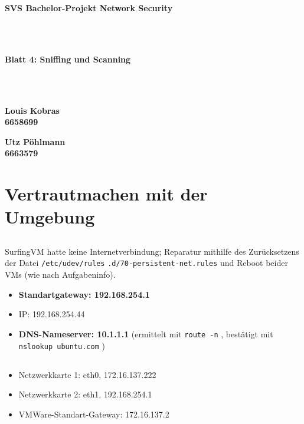 \documentclass[twoside]{article}
\newcommand{\ttt}[1]{%
	\texttt{#1}%
}
\begin{document}
\pagestyle{fancy}
\fancyhead{}
\fancyfoot{}

\begin{center}
\begin{Huge}
\textbf{SVS Bachelor-Projekt Network Security}
\end{Huge}\\\-\\
\begin{Large}
\textbf{Blatt 4: Sniffing und Scanning}
\end{Large}\\\-\\
\begin{minipage}[t]{0.48\textwidth}
\begin{center}\textbf{
	Louis Kobras\\
	6658699}
\end{center}
\end{minipage}
\begin{minipage}[t]{0.48\textwidth}
\begin{center}\textbf{
	Utz Pöhlmann\\
	6663579}
\end{center}
\end{minipage}
\end{center}

\section{Vertrautmachen mit der Umgebung}
\setcounter{subsection}{1}
\subsection{}
SurfingVM hatte keine Internetverbindung; Reparatur mithilfe des Zurücksetzens der Datei \ttt{/etc/udev/rules} \ttt{.d/70-persistent-net.rules} und Reboot beider VMs (wie nach Aufgabeninfo).
\begin{itemize}
	\item \textbf{Standartgateway: 192.168.254.1}
	\item IP: 192.168.254.44
	\item \textbf{DNS-Nameserver: 10.1.1.1} (ermittelt mit \ttt{route -n}, bestätigt mit \ttt{nslookup ubuntu.com})
\end{itemize}
\subsection{}
\begin{itemize}
	\item Netzwerkkarte 1: eth0, 172.16.137.222
	\item Netzwerkkarte 2: eth1, 192.168.254.1
	\item VMWare-Standart-Gateway: 172.16.137.2
\end{itemize}
\end{document}
